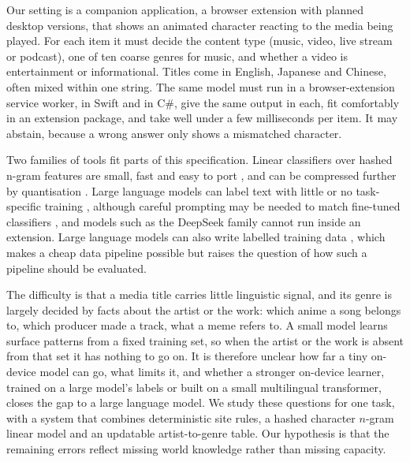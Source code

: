 \documentclass[11pt]{article}
\begin{document}
Our setting is a companion application, a browser extension with planned desktop versions, that shows an animated character reacting to the media being played. For each item it must decide the content type (music, video, live stream or podcast), one of ten coarse genres for music, and whether a video is entertainment or informational. Titles come in English, Japanese and Chinese, often mixed within one string. The same model must run in a browser-extension service worker, in Swift and in C\#, give the same output in each, fit comfortably in an extension package, and take well under a few milliseconds per item. It may abstain, because a wrong answer only shows a mismatched character.

Two families of tools fit parts of this specification. Linear classifiers over hashed n-gram features are small, fast and easy to port \citep{joulin2017bag,weinberger2009feature}, and can be compressed further by quantisation \citep{joulin2016fasttextzip,gholami2021survey}. Large language models can label text with little or no task-specific training \citep{gilardi2023chatgpt,wang2021want}, although careful prompting may be needed to match fine-tuned classifiers \citep{sun2023text}, and models such as the DeepSeek family \citep{deepseekai2024deepseekv3} cannot run inside an extension. Large language models can also write labelled training data \citep{li2023synthetic,long2024llmsdriven}, which makes a cheap data pipeline possible but raises the question of how such a pipeline should be evaluated.

The difficulty is that a media title carries little linguistic signal, and its genre is largely decided by facts about the artist or the work: which anime a song belongs to, which producer made a track, what a meme refers to. A small model learns surface patterns from a fixed training set, so when the artist or the work is absent from that set it has nothing to go on. It is therefore unclear how far a tiny on-device model can go, what limits it, and whether a stronger on-device learner, trained on a large model's labels or built on a small multilingual transformer, closes the gap to a large language model. We study these questions for one task, with a system that combines deterministic site rules, a hashed character $n$-gram linear model and an updatable artist-to-genre table. Our hypothesis is that the remaining errors reflect missing world knowledge rather than missing capacity.
\end{document}
